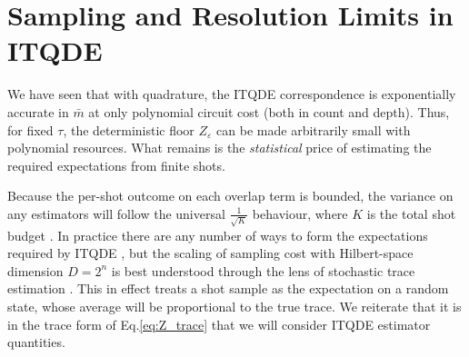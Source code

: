 \documentclass[reprint, aps,prx,showpacs,bibfootnote,preprintnumbers, mathtools, superscriptaddress, amsmath,amssymb]{revtex4-2}
\begin{document}
\section{Sampling and Resolution Limits in ITQDE \label{sec:sampling}}
We have seen that with quadrature, the ITQDE correspondence is exponentially accurate in $\bar m$ at only polynomial circuit cost (both in count and depth). Thus, for fixed $\tau$,
the deterministic floor $Z_\varepsilon$ can be made arbitrarily small with polynomial resources. What remains is the \emph{statistical} price of estimating the required expectations from finite shots.

Because the per-shot outcome on each overlap term is bounded, the variance on any estimators will follow the universal $\frac{1}{\sqrt{K}}$ behaviour, where $K$ is the total shot budget \cite{nielsen_quantum_2010}. In practice there are any number of ways to form the expectations required by ITQDE \cite{elben_cross-platform_2020,huang_predicting_2020, flammia_direct_2011, garttner_measuring_2017}, but the scaling of sampling cost with Hilbert-space dimension $D=2^n$ is best understood through the lens of stochastic trace estimation \cite{PhysRevA.80.012304}. This in effect treats a shot sample as the expectation on a random state, whose average will be proportional to the true trace. We reiterate that it is in the trace form of Eq.\eqref{eq:Z_trace} that we will consider ITQDE estimator quantities.
\end{document}
